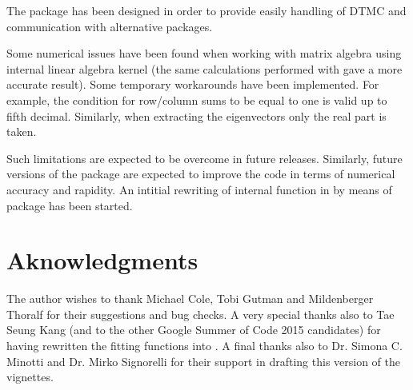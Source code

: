 \documentclass[nojss]{jss}
\begin{document}
The  package has been designed in order to provide easily handling of DTMC and communication with alternative packages.

Some numerical issues have been found when working with matrix algebra using
 internal linear algebra kernel (the same calculations performed
with  gave a more accurate result).
Some temporary workarounds have been implemented. For example, the condition for row/column sums to be equal to
one is valid up to fifth decimal. Similarly, when extracting the eigenvectors
only the real part is taken.

Such limitations are expected to be overcome in future releases. Similarly,
future versions of the package are expected to improve the code in terms of numerical accuracy and rapidity.
An intitial rewriting of internal function in  by means of  package \citep{RcppR} has been started.


\section*{Aknowledgments}\label{sec:aknowledgements}

The author wishes to thank Michael Cole, Tobi Gutman and Mildenberger Thoralf for their suggestions and bug checks. A very special thanks also to Tae Seung Kang (and to the other Google Summer of Code 2015 candidates) for having rewritten the fitting functions into . A final thanks also to Dr. Simona C. Minotti and Dr. Mirko Signorelli for their support in drafting this version of the vignettes.   


\end{document}
